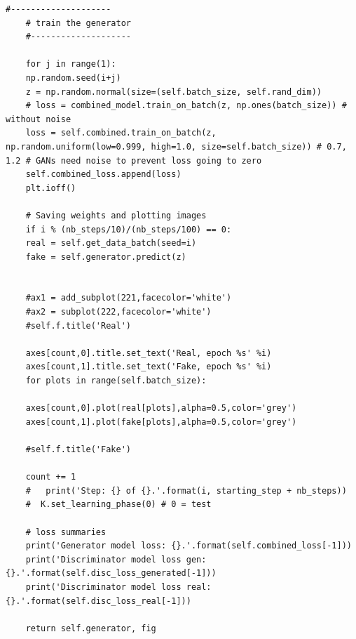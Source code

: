 \begin{lstlisting}[backgroundcolor = \color{white}]
	#--------------------
	# train the generator
	#--------------------
	
	for j in range(1):
	np.random.seed(i+j)
	z = np.random.normal(size=(self.batch_size, self.rand_dim))
	# loss = combined_model.train_on_batch(z, np.ones(batch_size)) # without noise
	loss = self.combined.train_on_batch(z, np.random.uniform(low=0.999, high=1.0, size=self.batch_size)) # 0.7, 1.2 # GANs need noise to prevent loss going to zero
	self.combined_loss.append(loss)
	plt.ioff()
	
	# Saving weights and plotting images
	if i % (nb_steps/10)/(nb_steps/100) == 0:
	real = self.get_data_batch(seed=i)
	fake = self.generator.predict(z)
	
	
	#ax1 = add_subplot(221,facecolor='white')
	#ax2 = subplot(222,facecolor='white')
	#self.f.title('Real')
	
	axes[count,0].title.set_text('Real, epoch %s' %i)
	axes[count,1].title.set_text('Fake, epoch %s' %i)
	for plots in range(self.batch_size):
	
	axes[count,0].plot(real[plots],alpha=0.5,color='grey') 
	axes[count,1].plot(fake[plots],alpha=0.5,color='grey') 
	
	#self.f.title('Fake')
	
	count += 1
	#   print('Step: {} of {}.'.format(i, starting_step + nb_steps))
	#  K.set_learning_phase(0) # 0 = test
	
	# loss summaries      
	print('Generator model loss: {}.'.format(self.combined_loss[-1]))
	print('Discriminator model loss gen: {}.'.format(self.disc_loss_generated[-1]))
	print('Discriminator model loss real: {}.'.format(self.disc_loss_real[-1]))
	
	return self.generator, fig

\end{lstlisting}

